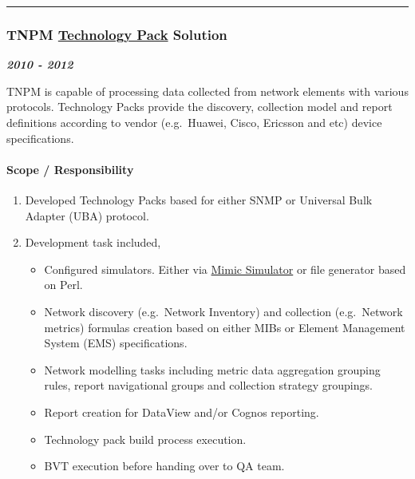\documentclass[
]{article}
\providecommand{\tightlist}{%
  \setlength{\itemsep}{0pt}\setlength{\parskip}{0pt}}
\begin{document}
\begin{center}\rule{0.5\linewidth}{0.5pt}\end{center}

\hypertarget{tnpm-technology-pack-solution}{%
\subsubsection{\texorpdfstring{TNPM
\href{http://www.ibm.com/support/knowledgecenter/SSBNJ7_1.4.0/com.ibm.tnpm_tp14D.doc/pack_install_config/ctnpm_tpinstall_introduction_modify_1.html}{Technology
Pack}
Solution}{TNPM Technology Pack Solution}}\label{tnpm-technology-pack-solution}}

\textbf{\emph{2010 - 2012}}

TNPM is capable of processing data collected from network elements with
various protocols. Technology Packs provide the discovery, collection
model and report definitions according to vendor (e.g.~Huawei, Cisco,
Ericsson and etc) device specifications.

\hypertarget{scope-responsibility-12}{%
\paragraph{Scope / Responsibility}\label{scope-responsibility-12}}

\begin{enumerate}
\def\labelenumi{\arabic{enumi}.}
\tightlist
\item
  Developed Technology Packs based for either SNMP or Universal Bulk
  Adapter (UBA) protocol.
\item
  Development task included,

  \begin{itemize}
  \tightlist
  \item
    Configured simulators. Either via
    \href{http://www.gambitcomm.com/site/products/mimic_simulator.shtml}{Mimic
    Simulator} or file generator based on Perl.
  \item
    Network discovery (e.g.~Network Inventory) and collection
    (e.g.~Network metrics) formulas creation based on either MIBs or
    Element Management System (EMS) specifications.
  \item
    Network modelling tasks including metric data aggregation grouping
    rules, report navigational groups and collection strategy groupings.
  \item
    Report creation for DataView and/or Cognos reporting.
  \item
    Technology pack build process execution.
  \item
    BVT execution before handing over to QA team.
  \end{itemize}
\end{enumerate}
\end{document}
